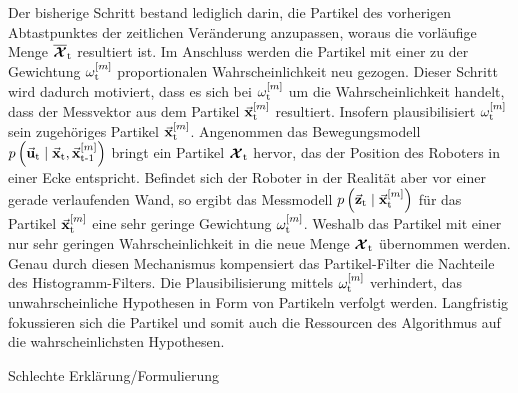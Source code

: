 Der bisherige Schritt bestand lediglich darin, die Partikel des vorherigen Abtastpunktes der zeitlichen Veränderung anzupassen, woraus die vorläufige Menge $\overline{\boldsymbol{\mathcal{X}}}_{\text{t}}$ resultiert ist. Im Anschluss werden die Partikel mit einer zu der Gewichtung $\omega_{\text{t}}^{[m]}$ proportionalen Wahrscheinlichkeit neu gezogen. Dieser Schritt wird dadurch motiviert, dass es sich bei $\omega_{\text{t}}^{[m]}$ um die Wahrscheinlichkeit handelt, dass der Messvektor aus dem Partikel $\vec{\mathbf{x}}_{\text{t}}^{[m]}$ resultiert. Insofern plausibilisiert $\omega_{\text{t}}^{[m]}$ sein zugehöriges Partikel $\vec{\mathbf{x}}_{\text{t}}^{[m]}$. Angenommen das Bewegungsmodell $p\left({\vec{\mathbf{u}}_{\text{t}}} \hspace{1mm} \vert \hspace{1mm} {\vec{\mathbf{x}}_{\text{t}}, \vec{\mathbf{x}}_{\text{t-1}}^{[m]}}\right)$ bringt ein Partikel $\boldsymbol{\mathcal{X}}_{\text{t}}$ hervor, das der Position des Roboters in einer Ecke entspricht. Befindet sich der Roboter in der Realität aber vor einer gerade verlaufenden Wand, so ergibt das Messmodell $p\left({\vec{\mathbf{z}}_{\text{t}}} \hspace{1mm} \vert \hspace{1mm} {\vec{\mathbf{x}}_{\text{t}}^{[m]}}\right)$ für das Partikel $\vec{\mathbf{x}}_{\text{t}}^{[m]}$ eine sehr geringe Gewichtung $\omega_{\text{t}}^{[m]}$. Weshalb das Partikel mit einer nur sehr geringen Wahrscheinlichkeit in die neue Menge $\boldsymbol{\mathcal{X}}_{\text{t}}$ übernommen werden. Genau durch diesen Mechanismus kompensiert das Partikel-Filter die Nachteile des Histogramm-Filters. Die Plausibilisierung mittels $\omega_{\text{t}}^{[m]}$ verhindert, das unwahrscheinliche Hypothesen in Form von Partikeln verfolgt werden. Langfristig fokussieren sich die Partikel und somit auch die Ressourcen des Algorithmus auf die wahrscheinlichsten Hypothesen.

{\color{red} Schlechte Erklärung/Formulierung}
